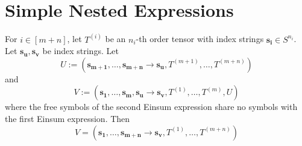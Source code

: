 \section{Simple Nested Expressions}

\begin{theorem}
    \label{thm:nested_einsum:1}

    For $i \in [m + n]$, let $T^{(i)}$ be an $n_i$-th order tensor with index strings $\bm{s_i} \in S^{n_i}$.
    Let $\bm{s_u}, \bm{s_v}$ be index strings.
    Let
    $$U := (\bm{s_{m + 1}},\dots,\bm{s_{m + n}} \rightarrow \bm{s_u}, T^{(m + 1)},\dots,T^{(m + n)})$$
    and
    $$V := (\bm{s_1},\dots,\bm{s_m}, \bm{s_u} \rightarrow \bm{s_v}, T^{(1)},\dots,T^{(m)}, U)$$
    where the free symbols of the second Einsum expression share no symbols with the first Einsum expression.
    Then
    $$V = (\bm{s_1}, \dots, \bm{s_{m + n}} \rightarrow \bm{s_v}, T^{(1)}, \dots, T^{(m + n)})$$
\end{theorem}

